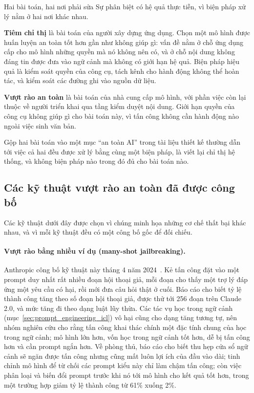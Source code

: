 \begin{assess}{Hai bài toán, hai nơi phải sửa}
Sự phân biệt có hệ quả thực tiễn, vì biện pháp xử lý nằm ở hai nơi khác nhau.

\textbf{Tiêm chỉ thị} là bài toán của người xây dựng ứng dụng. Chọn một mô hình được huấn luyện an toàn tốt hơn gần như không giúp gì: vấn đề nằm ở chỗ ứng dụng cấp cho mô hình những quyền mà nó không nên có, và ở chỗ nội dung không đáng tin được đưa vào ngữ cảnh mà không có giới hạn hệ quả. Biện pháp hiệu quả là kiểm soát quyền của công cụ, tách kênh cho hành động không thể hoàn tác, và kiểm soát các đường ghi vào nguồn dữ liệu.

\textbf{Vượt rào an toàn} là bài toán của nhà cung cấp mô hình, với phần việc còn lại thuộc về người triển khai qua tầng kiểm duyệt nội dung. Giới hạn quyền của công cụ không giúp gì cho bài toán này, vì tấn công không cần hành động nào ngoài việc sinh văn bản.

Gộp hai bài toán vào một mục ``an toàn AI'' trong tài liệu thiết kế thường dẫn tới việc cả hai đều được xử lý bằng cùng một biện pháp, là viết lại chỉ thị hệ thống, và không biện pháp nào trong đó đủ cho bài toán nào.
\end{assess}

\subsection{Các kỹ thuật vượt rào an toàn đã được công bố}
\label{ssec:jailbreak_techniques}

Các kỹ thuật dưới đây được chọn vì chúng minh họa những cơ chế thất bại khác nhau, và vì mỗi kỹ thuật đều có một công bố gốc để đối chiếu.

\paragraph{Vượt rào bằng nhiều ví dụ (many-shot jailbreaking).} Anthropic công bố kỹ thuật này tháng 4 năm 2024~\cite{anthropic2024manyshot}. Kẻ tấn công đặt vào một prompt duy nhất rất nhiều đoạn hội thoại giả, mỗi đoạn cho thấy một trợ lý đáp ứng một yêu cầu có hại, rồi mới đưa câu hỏi thật ở cuối. Báo cáo cho biết tỷ lệ thành công tăng theo số đoạn hội thoại giả, được thử tới 256 đoạn trên Claude 2.0, và mức tăng đi theo dạng luật lũy thừa. Các tác vụ học trong ngữ cảnh (mục~\ref{sec:prompt_engineering_icl}) vô hại cũng cho dạng tăng tương tự, nên nhóm nghiên cứu cho rằng tấn công khai thác chính một đặc tính chung của học trong ngữ cảnh; mô hình lớn hơn, vốn học trong ngữ cảnh tốt hơn, dễ bị tấn công hơn và cần prompt ngắn hơn. Về phòng thủ, báo cáo cho biết thu hẹp cửa sổ ngữ cảnh sẽ ngăn được tấn công nhưng cũng mất luôn lợi ích của đầu vào dài; tinh chỉnh mô hình để từ chối các prompt kiểu này chỉ làm chậm tấn công; còn việc phân loại và biến đổi prompt trước khi nó tới mô hình cho kết quả tốt hơn, trong một trường hợp giảm tỷ lệ thành công từ 61\% xuống 2\%.

